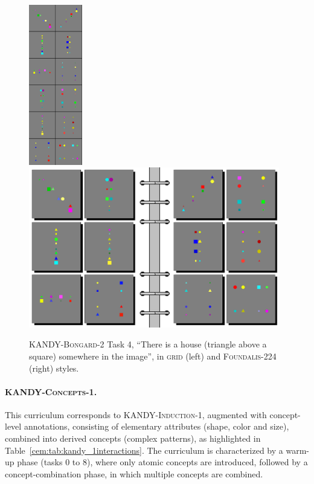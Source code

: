 \begin{figure}
    \centering
    \includegraphics[height=7cm]{imgs/kandy/Fig2a}
    \hfill
    \includegraphics[height=7cm]{imgs/kandy/Fig2b}
    \caption[\textsc{KANDY-Bongard-2} task 4]{\textsc{KANDY-Bongard-2} Task 4, ``There is a house (triangle above a square) somewhere in the image'', in \textsc{grid} (left) and \textsc{Foundalis-224} (right) styles.}
    \label{kandy:fig:bongard}
\end{figure}


\paragraph{\textsc{KANDY-Concepts-1}.}
This curriculum corresponds to \textsc{KANDY-Induction-1}, augmented with concept-level annotations, consisting of elementary attributes (shape, color and size), combined into derived concepts (complex patterns), as highlighted in Table~\ref{cem:tab:kandy_1interactions}. The curriculum is characterized by a warm-up phase (tasks 0 to 8), where only atomic concepts are introduced, followed by a concept-combination phase, in which multiple concepts are combined.

